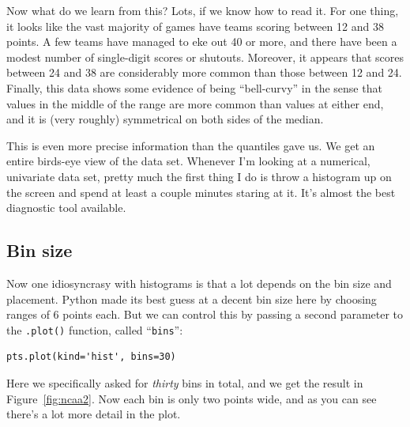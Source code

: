 Now what do we learn from this? Lots, if we know how to read it. For one thing,
it looks like the vast majority of games have teams scoring between 12 and 38
points. A few teams have managed to eke out 40 or more, and there have been a
modest number of single-digit scores or shutouts. Moreover, it appears that
scores between 24 and 38 are considerably more common than those between 12 and
24. Finally, this data shows some evidence of being ``bell-curvy'' in the sense
that values in the middle of the range are more common than values at either
end, and it is (very roughly) symmetrical on both sides of the median.

This is even more precise information than the quantiles gave us. We get an
entire birds-eye view of the data set. Whenever I'm looking at a numerical,
univariate data set, pretty much the first thing I do is throw a histogram up
on the screen and spend at least a couple minutes staring at it. It's almost
the best diagnostic tool available.

\subsection{Bin size}


Now one idiosyncrasy with histograms is that a lot depends on the bin size and
placement. Python made its best guess at a decent bin size here by choosing
ranges of 6 points each. But we can control this by passing a second parameter
to the \texttt{.plot()} function, called ``\texttt{bins}'':

\begin{Verbatim}[fontsize=\small,samepage=true,frame=single,framesep=3mm]
pts.plot(kind='hist', bins=30)
\end{Verbatim}

Here we specifically asked for \textit{thirty} bins in total, and we get the
result in Figure~\ref{fig:ncaa2}. Now each bin is only two points wide, and as
you can see there's a lot more detail in the plot.

